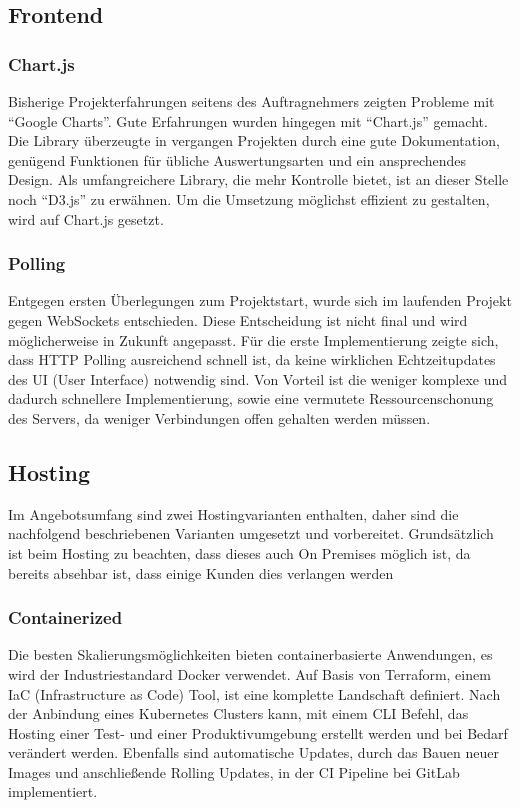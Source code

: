\subsection{Frontend}

\subsubsection{Chart.js}
Bisherige Projekterfahrungen seitens des Auftragnehmers zeigten Probleme mit \enquote{Google Charts}.
Gute Erfahrungen wurden hingegen mit \enquote{Chart.js} gemacht.
Die Library überzeugte in vergangen Projekten durch eine gute Dokumentation, genügend Funktionen für übliche Auswertungsarten und ein ansprechendes Design.
Als umfangreichere Library, die mehr Kontrolle bietet, ist an dieser Stelle noch \enquote{D3.js} zu erwähnen.
Um die Umsetzung möglichst effizient zu gestalten, wird auf Chart.js gesetzt.

\subsubsection{Polling}
Entgegen ersten Überlegungen zum Projektstart, wurde sich im laufenden Projekt gegen WebSockets entschieden.
Diese Entscheidung ist nicht final und wird möglicherweise in Zukunft angepasst.
Für die erste Implementierung zeigte sich, dass HTTP Polling ausreichend schnell ist, da keine wirklichen Echtzeitupdates des UI (User Interface) notwendig sind.
Von Vorteil ist die weniger komplexe und dadurch schnellere Implementierung, sowie eine vermutete Ressourcenschonung des Servers, da weniger Verbindungen offen gehalten werden müssen.

\subsection{Hosting}
Im Angebotsumfang sind zwei Hostingvarianten enthalten, daher sind die nachfolgend beschriebenen Varianten umgesetzt und vorbereitet.
Grundsätzlich ist beim Hosting zu beachten, dass dieses auch On Premises möglich ist, da bereits absehbar ist, dass einige Kunden dies verlangen werden

\subsubsection{Containerized}
Die besten Skalierungsmöglichkeiten bieten containerbasierte Anwendungen, es wird der Industriestandard Docker verwendet.
Auf Basis von Terraform, einem IaC (Infrastructure as Code) Tool, ist eine komplette Landschaft definiert.
Nach der Anbindung eines Kubernetes Clusters kann, mit einem CLI Befehl, das Hosting einer Test- und einer Produktivumgebung erstellt werden und bei Bedarf verändert werden.
Ebenfalls sind automatische Updates, durch das Bauen neuer Images und anschließende Rolling Updates, in der CI Pipeline bei GitLab implementiert.

